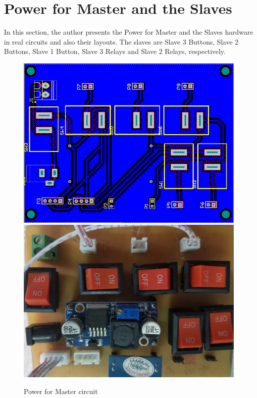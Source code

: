 \section{Power for Master and the Slaves}
In this section, the author presents the Power for Master and the Slaves hardware in real circuits and also their layouts. The slaves are Slave 3 Buttons, Slave 2 Buttons, Slave 1 Button, Slave 3 Relays and Slave 2 Relays, respectively.
\begin{figure}[!htbp]
    \begin{center}
    \includegraphics[scale=0.65]{images/powerLayout.png}\\

    \includegraphics[scale=0.13]{images/power.jpg}
    \caption{Power for Master circuit}
    \label{fig:powerCircuit}
    \end{center}
\end{figure}
